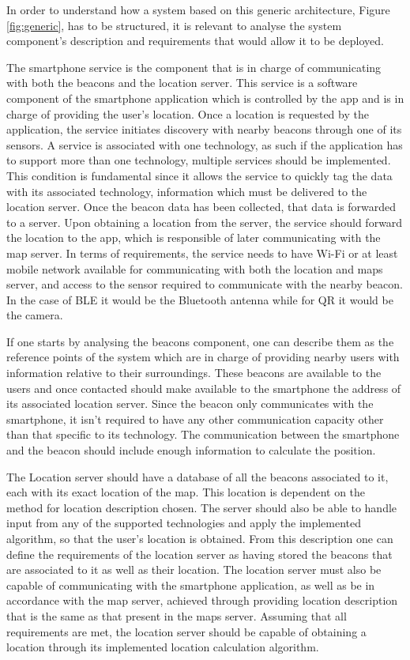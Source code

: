  
In order to understand how a system based on this generic architecture, Figure \ref{fig:generic}, has to be structured, it is relevant to analyse the system component's description and requirements that would allow it to be deployed.  
 
 
The smartphone service is the component that is in charge of communicating with both the beacons and the location server. This service is a software component of the smartphone application which is controlled by the app and is in charge of providing the user's location. Once a location is requested by the application, the service initiates discovery with nearby beacons through one of its sensors. A service is associated with one technology, as such if the application has to support more than one technology, multiple services should be implemented. This condition is fundamental since it allows the service to quickly tag the data with its associated technology, information which must be delivered to the location server. Once the beacon data has been collected, that data is forwarded to a server. Upon obtaining a location from the server, the service should forward the location to the app, which is responsible of later communicating with the map server. In terms of requirements, the service needs to have Wi-Fi or at least mobile network available for communicating with both the location and maps server, and access to the sensor required to communicate with the nearby beacon. In the case of BLE it would be the Bluetooth antenna while for QR it would be the camera. 
 
 
If one starts by analysing the beacons component, one can describe them as the reference points of the system which are in charge of providing nearby users with information relative to their surroundings. These beacons are available to the users and once contacted should make available to the smartphone the address of its associated location server. Since the beacon only communicates with the smartphone, it isn't required to have any other communication capacity other than that specific to its technology. The communication between the smartphone and the beacon should include enough information to calculate the position. 
 
 
The Location server should have a database of all the beacons associated to it, each with its exact location of the map. This location is dependent on the method for location description chosen. The server should also be able to handle input from any of the supported technologies and apply the implemented algorithm, so that the user's location is obtained. From this description one can define the requirements of the location server as having stored the beacons that are associated to it as well as their location. The location server must also be capable of communicating with the smartphone application, as well as be in accordance with the map server, achieved through providing location description that is the same as that present in the maps server. Assuming that all requirements are met, the location server should be capable of obtaining a location through its implemented location calculation algorithm. 
 
